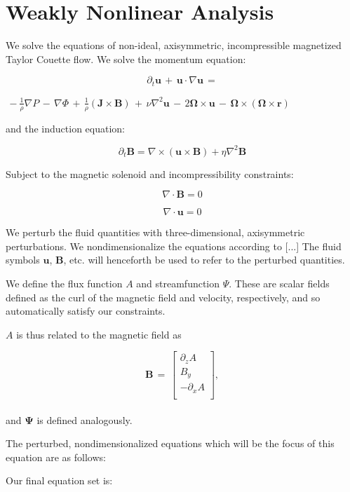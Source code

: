 \documentclass{emulateapj}
\newcommand{\beq}{\begin{equation}}
\newcommand{\eeq}{\end{equation}}
\begin{document}
\section{Weakly Nonlinear Analysis}

We solve the equations of non-ideal, axisymmetric, incompressible magnetized Taylor Couette flow. We solve the momentum equation:

\beq
\partial_t \mathbf{u} \, + \, \mathbf{u} \cdot \nabla \mathbf{u} \, = 
\eeq

$\, -\frac{1}{\rho}\nabla P \, - \, \nabla\Phi \, + \, \frac{1}{\rho} \left(\mathbf{J}\times\mathbf{B}\right) \, + \, \nu\nabla^2 \mathbf{u} \, - \, 2\mathbf{\Omega} \times \mathbf{u} \, - \, \mathbf{\Omega} \times \left(\mathbf{\Omega} \times \mathbf{r} \right)$


and the induction equation:

\beq
\partial_t \mathbf{B} = \nabla \times \left(\mathbf{u} \times \mathbf{B}\right) + \eta\nabla^2\mathbf{B}
\eeq

Subject to the magnetic solenoid and incompressibility constraints:

\beq
\nabla \cdot \mathbf{B} = 0
\eeq

\beq
\nabla \cdot \mathbf{u} = 0
\eeq

We perturb the fluid quantities with three-dimensional, axisymmetric perturbations. We nondimensionalize the equations according to [...]
The fluid symbols $\mathbf{u}$, $\mathbf{B}$, etc. will henceforth be used to refer to the perturbed quantities.

We define the flux function $A$ and streamfunction $\Psi$. These are scalar fields defined as the curl of the magnetic field and velocity, respectively, and so automatically satisfy our constraints.

$A$ is thus related to the magnetic field as

\beq
\mathbf{B} \, = \, \left[\begin{matrix}
\partial_zA \\
B_{y} \\
-\partial_xA \\
\end{matrix}\right],\eeq \\

and $\mathbf{\Psi}$ is defined analogously.

The perturbed, nondimensionalized equations which will be the focus of this equation are as follows:

Our final equation set is: 
\end{document}
